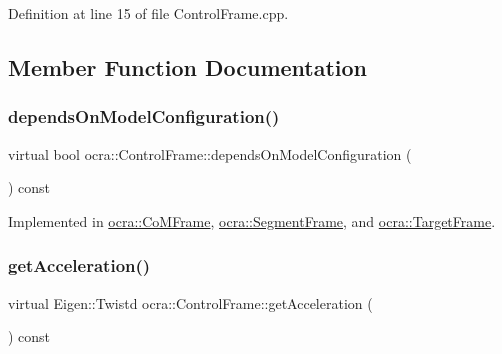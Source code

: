 Definition at line 15 of file Control\+Frame.\+cpp.



\subsection{Member Function Documentation}
\hypertarget{classocra_1_1ControlFrame_a65833d1f3f42bc8d452f8b1fb671e142}{}\label{classocra_1_1ControlFrame_a65833d1f3f42bc8d452f8b1fb671e142} 
\subsubsection{\texorpdfstring{depends\+On\+Model\+Configuration()}{dependsOnModelConfiguration()}}
{\footnotesize\ttfamily virtual bool ocra\+::\+Control\+Frame\+::depends\+On\+Model\+Configuration (\begin{DoxyParamCaption}{ }\end{DoxyParamCaption}) const\hspace{0.3cm}{\ttfamily [pure virtual]}}



Implemented in \hyperlink{classocra_1_1CoMFrame_aaae3fd05da2f9e301dbe1c54b57fe624}{ocra\+::\+Co\+M\+Frame}, \hyperlink{classocra_1_1SegmentFrame_a68708b5ced24d192fbb0bfd9e3647925}{ocra\+::\+Segment\+Frame}, and \hyperlink{classocra_1_1TargetFrame_ab4512f64463c359090ffdbead9a9e349}{ocra\+::\+Target\+Frame}.

\hypertarget{classocra_1_1ControlFrame_a0ceb7cd7c3fe90fa0ef311b96a6f5c88}{}\label{classocra_1_1ControlFrame_a0ceb7cd7c3fe90fa0ef311b96a6f5c88} 
\subsubsection{\texorpdfstring{get\+Acceleration()}{getAcceleration()}}
{\footnotesize\ttfamily virtual Eigen\+::\+Twistd ocra\+::\+Control\+Frame\+::get\+Acceleration (\begin{DoxyParamCaption}{ }\end{DoxyParamCaption}) const\hspace{0.3cm}{\ttfamily [pure virtual]}}



